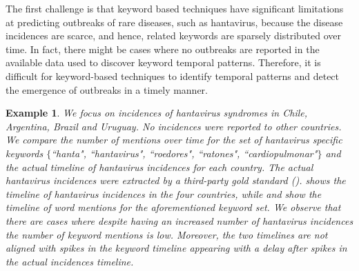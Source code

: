 \documentclass[conference]{IEEEtran}
\newtheorem{example}{Example}
\begin{document}
The first challenge is that keyword based techniques have significant limitations at predicting outbreaks of rare diseases, such as hantavirus, because the disease incidences are scarce, and hence, related keywords are sparsely distributed over time.  In fact, there might be cases where no outbreaks are reported in the available data used to discover keyword temporal patterns. Therefore, it is difficult for keyword-based techniques to identify temporal patterns and detect the emergence of outbreaks in a timely manner.

\begin{example}
{\em We focus on incidences of hantavirus syndromes in Chile, Argentina, Brazil and Uruguay. No incidences were reported to other countries. We compare the number of mentions over time for the set of hantavirus specific keywords $\{$``hanta", ``hantavirus", ``roedores", ``ratones", ``cardiopulmonar"$\}$ and the actual timeline of hantavirus incidences for each country. The actual hantavirus incidences were extracted by a third-party gold standard ().   shows the timeline of hantavirus incidences in the four countries, while  and  show the timeline of word mentions for the aforementioned keyword set. We observe that there are cases where despite having an increased number of hantavirus incidences the number of keyword mentions is low. Moreover, the two timelines are not aligned with spikes in the keyword timeline appearing with a delay after spikes in the actual incidences timeline.}
\end{example}
\end{document}

